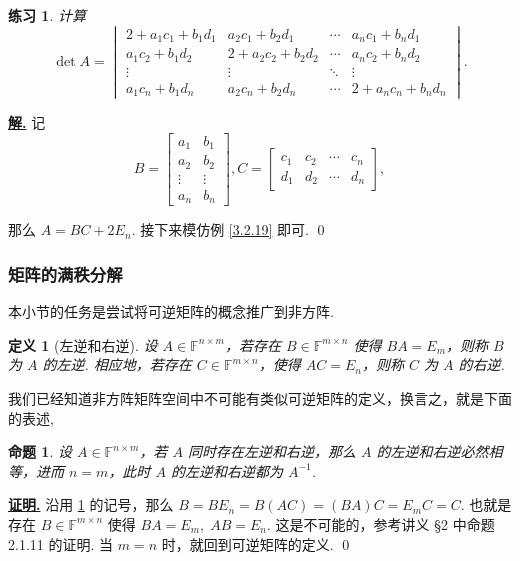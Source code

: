 \documentclass[10pt,openany]{article}
\theoremstyle{thmstyle} %
\newtheorem{practice}{练习}[section]
\theoremstyle{defstyle} %
\newtheorem{definition}[theorem]{定义}
\theoremstyle{prostyle} %
\newtheorem{proposition}[theorem]{命题}
\theoremstyle{exastyle}
\theoremstyle{remstyle}
\renewenvironment{proof}[1][证明]{\par\underline{\textbf{#1.}} \;\fangsong}{\qed\par}
\newenvironment{solution}{\par\underline{\textbf{解.}} \;\fangsong}{\qed\par}
\newcommand{\F}{\mathbb{F}}
\newcommand{\mn}{^{m \times n}}
\newcommand{\nm}{^{n \times m}}
\begin{document}
\begin{practice}
	计算
	\[ \det A=\begin{vmatrix}
		2 + a_1 c_1 + b_1 d_1 & a_2 c_1 + b_2 d_1 & \cdots & a_n c_1 + b_n d_1 \\
		a_1 c_2 + b_1 d_2 & 2 + a_2 c_2 + b_2 d_2 & \cdots & a_n c_2 + b_n d_2 \\
		\vdots & \vdots & \ddots & \vdots \\
		a_1 c_n + b_1 d_n & a_2 c_n + b_2 d_n & \cdots & 2 + a_n c_n + b_n d_n
	\end{vmatrix}. \]
\end{practice}

\begin{solution}
	记
	\[ B=\begin{bmatrix}
		a_1 & b_1 \\ 
		a_2 & b_2 \\
		\vdots & \vdots \\
		a_n & b_n
	\end{bmatrix}, C=\begin{bmatrix}
	  c_1 & c_2 & \cdots & c_n \\
	  d_1 & d_2 & \cdots & d_n
	\end{bmatrix}, \]
	
	那么 \( A=BC+2E_n \). 接下来模仿例 \ref{3.2.19} 即可.
\end{solution}

\subsubsection{矩阵的满秩分解} \label{2.4}

本小节的任务是尝试将可逆矩阵的概念推广到非方阵.

\begin{definition}[左逆和右逆] \label{3.2.20}
	设 \( A \in \F\nm \)，若存在 \( B \in \F\mn \) 使得 \( BA=E_m \)，则称 \( B \) 为 \( A \) 的左逆. 相应地，若存在 \( C \in \F\mn \)，使得 \( AC=E_n \)，则称 \( C \) 为 \( A \) 的右逆.
\end{definition}

我们已经知道非方阵矩阵空间中不可能有类似可逆矩阵的定义，换言之，就是下面的表述,

\begin{proposition}
   设 \( A \in \F\nm \)，若 \( A \) 同时存在左逆和右逆，那么 \( A \) 的左逆和右逆必然相等，进而 \( n=m \)，此时 \( A \) 的左逆和右逆都为 \( A^{-1} \).
\end{proposition}

\begin{proof}
   沿用 \ref{3.2.20} 的记号，那么 \( B=BE_n=B(AC)=(BA)C=E_mC=C \). 也就是存在 \( B \in \F\mn \) 使得 \( BA=E_m, \; AB=E_n \). 这是不可能的，参考讲义 \S 2 中命题 2.1.11 的证明. 当 \( m=n \) 时，就回到可逆矩阵的定义.
\end{proof}
\end{document}
